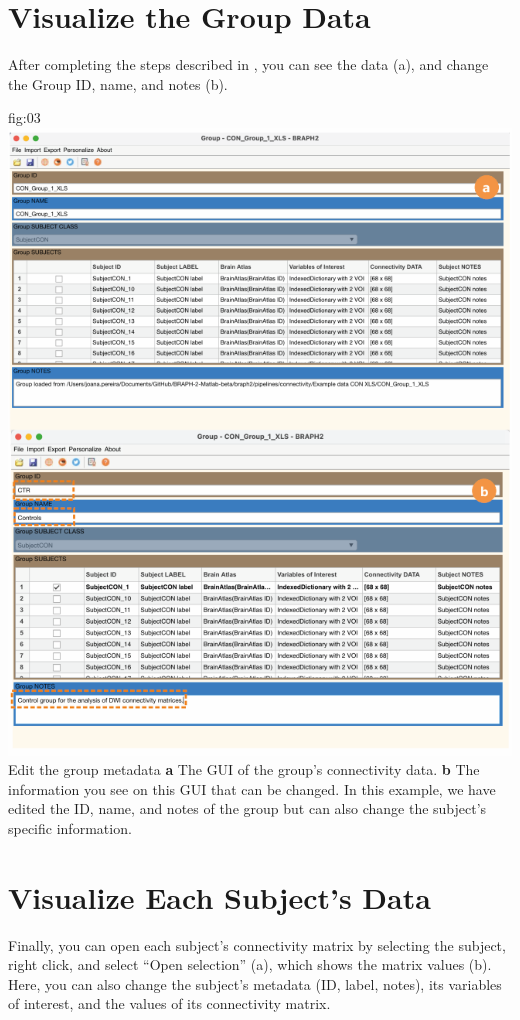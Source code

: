 \documentclass[justified]{tufte-handout}
\begin{document}
\section{Visualize the Group Data}

After completing the steps described in , you can see the data (a), and change the Group ID, name, and notes (b). 

	{fig:03}
	{
	\includegraphics{fig03.png}
	}
	{Edit the group metadata}
	{ 
	{\bf a} The GUI of the group's connectivity data. 
	{\bf b} The information you see on this GUI that can be changed. In this example, we have edited the ID, name, and notes of the group but can also change the subject's specific information.
	}

\section{Visualize Each Subject's Data}

Finally, you can open each subject's connectivity matrix by selecting the subject, right click, and select ``Open selection'' (a), which shows the matrix values (b). Here, you can also change the subject's metadata (ID, label, notes), its variables of interest, and the values of its connectivity matrix.
\end{document}
